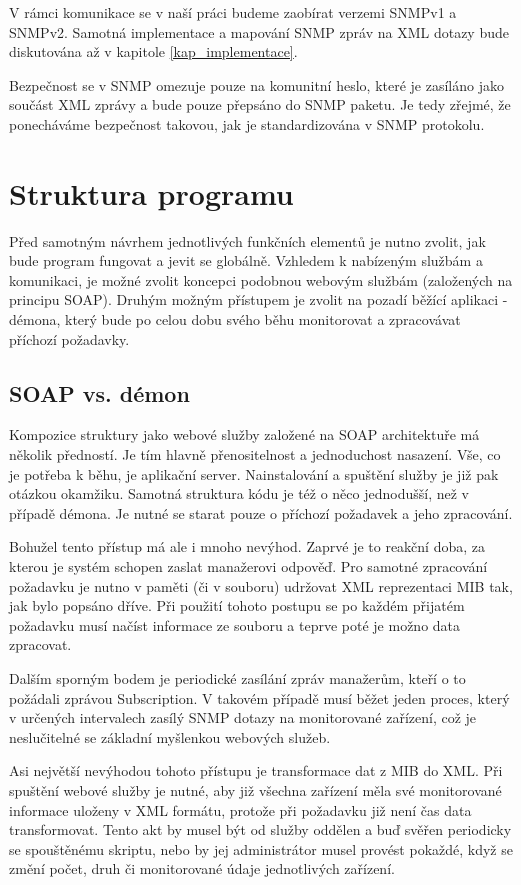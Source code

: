 V rámci komunikace se v naší práci budeme zaobírat verzemi SNMPv1 a SNMPv2. Samotná implementace a mapování SNMP zpráv na XML dotazy
bude diskutována až v kapitole \ref{kap_implementace}.

Bezpečnost se v SNMP omezuje pouze na komunitní heslo, které je zasíláno jako součást XML zprávy a bude pouze přepsáno do SNMP paketu. 
Je tedy zřejmé, že ponecháváme bezpečnost takovou, jak je standardizována v SNMP protokolu.


\section{Struktura programu}
\label{sec_an_struktura_programu}
Před samotným návrhem jednotlivých funkčních elementů je nutno zvolit, jak bude program fungovat a jevit se globálně. Vzhledem k
nabízeným službám a komunikaci, je možné zvolit koncepci podobnou webovým službám (založených na principu SOAP). Druhým možným přístupem je zvolit
na pozadí běžící aplikaci - démona, který bude po celou dobu svého běhu monitorovat a zpracovávat příchozí požadavky.

\subsection{SOAP vs. démon}
Kompozice struktury jako webové služby založené na SOAP architektuře má několik předností. Je tím hlavně přenositelnost a jednoduchost nasazení. Vše, co je potřeba k běhu,
je aplikační server. Nainstalování a spuštění služby je již pak otázkou okamžiku. Samotná struktura kódu je též o něco jednodušší, než v případě démona. Je nutné se starat pouze o
příchozí požadavek a jeho zpracování.

Bohužel tento přístup má ale i mnoho nevýhod. Zaprvé je to reakční doba, za kterou je systém schopen zaslat manažerovi odpověď. Pro samotné zpracování požadavku
je nutno v paměti (či v souboru) udržovat XML reprezentaci MIB tak, jak bylo popsáno dříve. Při použití tohoto postupu se po každém přijatém požadavku musí načíst informace ze souboru
a teprve poté je možno data zpracovat.

Dalším sporným bodem je periodické zasílání zpráv manažerům, kteří o to požádali zprávou Subscription. V takovém případě musí běžet jeden proces, který v určených intervalech zasílý SNMP
dotazy na monitorované zařízení, což je neslučitelné se základní myšlenkou webových služeb.

Asi největší nevýhodou tohoto přístupu je transformace dat z MIB do XML. Při spuštění webové služby je nutné, aby již všechna zařízení měla své monitorované informace uloženy v XML formátu, 
protože při požadavku již není čas data transformovat. Tento akt by musel být od služby oddělen a buď svěřen periodicky se spouštěnému skriptu, nebo by jej administrátor musel provést pokaždé,
když se změní počet, druh či monitorované údaje jednotlivých zařízení.

